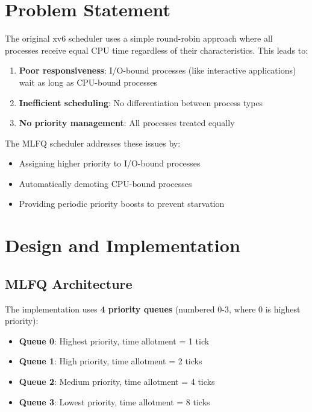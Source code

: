 \documentclass[11pt,a4paper]{article}
\begin{document}
\section{Problem Statement}

The original xv6 scheduler uses a simple round-robin approach where all processes receive equal CPU time regardless of their characteristics. This leads to:

\begin{enumerate}
    \item \textbf{Poor responsiveness}: I/O-bound processes (like interactive applications) wait as long as CPU-bound processes
    \item \textbf{Inefficient scheduling}: No differentiation between process types
    \item \textbf{No priority management}: All processes treated equally
\end{enumerate}

The MLFQ scheduler addresses these issues by:
\begin{itemize}
    \item Assigning higher priority to I/O-bound processes
    \item Automatically demoting CPU-bound processes
    \item Providing periodic priority boosts to prevent starvation
\end{itemize}

\section{Design and Implementation}

\subsection{MLFQ Architecture}

The implementation uses \textbf{4 priority queues} (numbered 0-3, where 0 is highest priority):

\begin{itemize}
    \item \textbf{Queue 0}: Highest priority, time allotment = 1 tick
    \item \textbf{Queue 1}: High priority, time allotment = 2 ticks
    \item \textbf{Queue 2}: Medium priority, time allotment = 4 ticks
    \item \textbf{Queue 3}: Lowest priority, time allotment = 8 ticks
\end{itemize}
\end{document}
